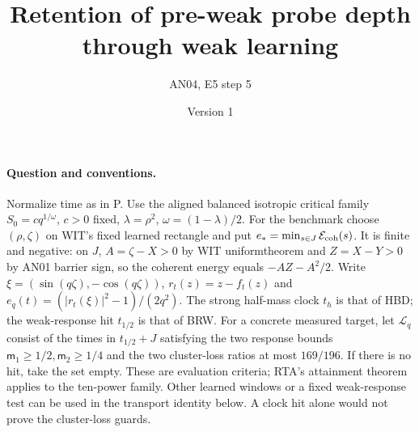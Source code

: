 \documentclass[11pt]{article}
\title{Retention of pre-weak probe depth through weak learning}
\author{AN04, E5 step 5}\date{Version 1}
\begin{document}
\maketitle
\paragraph{Question and conventions.}
Normalize time as in P. Use the aligned balanced isotropic critical
family $S_0=cq^{1/\omega}$, $c>0$ fixed,
$\lambda=\rho^2$, $\omega=(1-\lambda)/2$. For the benchmark choose
$(\rho,\zeta)$ on WIT's fixed learned rectangle and put
$e_*=\min_{s\in J}\mathcal E_{\rm coh}(s)$. It is finite and negative:
on $J$, $A=\zeta-X>0$ by WIT uniformtheorem and $Z=X-Y>0$
by AN01 barrier sign, so the coherent energy equals $-AZ-A^2/2$.
Write $\xi=(\sin(q\zeta),-\cos(q\zeta))$, $r_t(z)=z-f_t(z)$ and
$e_q(t)=(|r_t(\xi)|^2-1)/(2q^2)$.
The strong half-mass clock $t_h$ is that of HBD; the weak-response
hit $t_{1/2}$ is that of BRW. For a concrete measured target, let
$\mathcal L_q$ consist of the times in $t_{1/2}+J$ satisfying the
two response bounds $\mathsf m_1\ge1/2,\mathsf m_2\ge1/4$ and
the two cluster-loss ratios at most $169/196$. If there is no hit,
take the set empty. These are evaluation criteria; RTA's attainment
theorem applies to the ten-power family. Other learned windows or a
fixed weak-response test can be used in the transport identity below.
A clock hit alone would not prove the cluster-loss guards.
\end{document}
